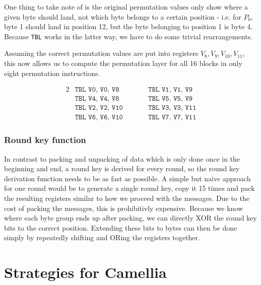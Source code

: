 One thing to take note of is the original permutation values only show where a
given byte should land, not which byte belongs to a certain position - i.e. for
$P_0$, byte 1 should land in position 12, but the byte belonging to position 1
is byte 4. Because \texttt{TBL} works in the latter way, we have to do some
trivial rearrangements.

Assuming the correct permutation values are put into registers
$V_8,V_9,V_{10},V_{11}$, this now allows us to compute the permutation layer
for all 16 blocks in only eight permutation instructions.

\begin{alignat*}{2}
    &\texttt{TBL V0, V0, V8}\qquad &&\texttt{TBL V1, V1, V9} \\
    &\texttt{TBL V4, V4, V8}\qquad &&\texttt{TBL V5, V5, V9} \\
    &\texttt{TBL V2, V2, V10}\qquad &&\texttt{TBL V3, V3, V11} \\
    &\texttt{TBL V6, V6, V10}\qquad &&\texttt{TBL V7, V7, V11}
\end{alignat*}

\subsubsection{Round key function}

In contrast to packing and unpacking of data which is only done once in the
beginning and end, a round key is derived for every round, so the round key
derivation function needs to be as fast as possible. A simple but naive
approach for one round would be to generate a single round key, copy it 15
times and pack the resulting registers similar to how we proceed with the
messages. Due to the cost of packing the messages, this is prohibitivly
expensive. Because we know where each byte group ends up after packing, we can
directly XOR the round key bits to the correct position. Extending these bits
to bytes can then be done simply by repeatedly shifting and ORing the registers
together.

\section{Strategies for Camellia}
